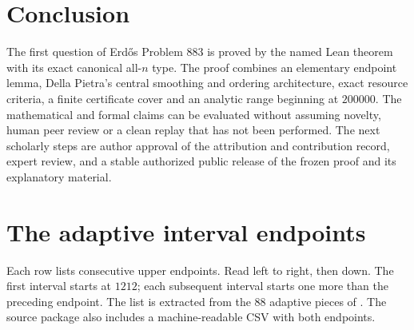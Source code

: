 \section{Conclusion}
The first question of Erdős Problem 883 is proved by the named Lean theorem with its exact canonical all-$n$ type. The proof combines an elementary endpoint lemma, Della Pietra's central smoothing and ordering architecture, exact resource criteria, a finite certificate cover and an analytic range beginning at $200000$. The mathematical and formal claims can be evaluated without assuming novelty, human peer review or a clean replay that has not been performed. The next scholarly steps are author approval of the attribution and contribution record, expert review, and a stable authorized public release of the frozen proof and its explanatory material.

\clearpage
\appendix
\section{The adaptive interval endpoints}\label{app:intervals}
Each row lists consecutive upper endpoints. Read left to right, then down. The first interval starts at $1212$; each subsequent interval starts one more than the preceding endpoint. The list is extracted from the $88$ adaptive pieces of . The source package also includes a machine-readable CSV with both endpoints.

